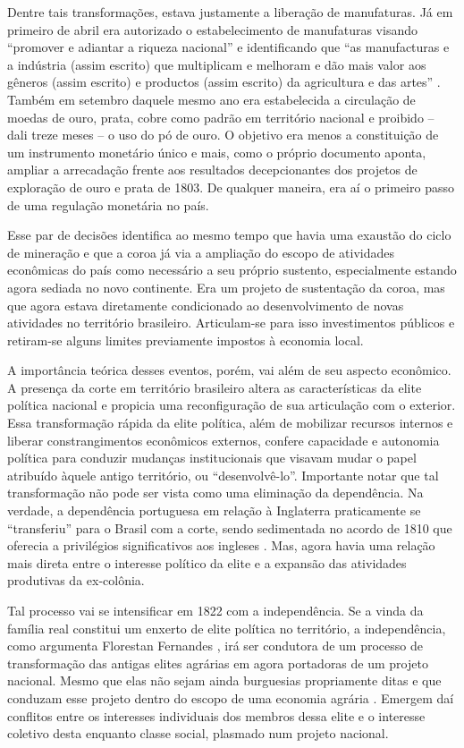 Dentre tais transformações, estava justamente a liberação de
manufaturas. Já em primeiro de abril era autorizado o estabelecimento de
manufaturas visando ``promover e adiantar a riqueza nacional'' e
identificando que ``as manufacturas e a indústria (assim escrito) que multiplicam
e melhoram e dão mais valor aos gêneros (assim escrito) e productos (assim escrito) da
agricultura e das artes'' \citep[]{alvará_1808}. Também em setembro daquele
mesmo ano era estabelecida a circulação de moedas de ouro, prata, cobre 
como padrão em território nacional e proibido -- dali treze meses -- o
uso do pó de ouro. O objetivo era menos a constituição de um instrumento
monetário único e mais, como o próprio documento aponta, ampliar a
arrecadação frente aos resultados decepcionantes dos projetos de
exploração de ouro e prata de 1803. De qualquer maneira, era aí o
primeiro passo de uma regulação monetária no país.

Esse par de decisões identifica ao mesmo tempo que havia uma exaustão do
ciclo de mineração e que a coroa já via a ampliação do escopo de
atividades econômicas do país como necessário a seu próprio sustento,
especialmente estando agora sediada no novo continente. Era um projeto
de sustentação da coroa, mas que agora estava diretamente condicionado
ao desenvolvimento de novas atividades no território brasileiro.
Articulam-se para isso investimentos públicos e retiram-se alguns
limites previamente impostos à economia local.

A importância teórica desses eventos, porém, vai além de seu
aspecto econômico. A presença da corte em território brasileiro altera as
características da elite política nacional e propicia uma reconfiguração de sua
articulação com o exterior. Essa transformação rápida da elite política,
além de mobilizar recursos internos e liberar constrangimentos
econômicos externos, confere capacidade e autonomia política para
conduzir mudanças institucionais que visavam mudar o papel atribuído
àquele antigo território, ou ``desenvolvê-lo''. Importante notar que
tal transformação não pode ser vista como uma eliminação da dependência.
Na verdade, a dependência portuguesa em relação à Inglaterra
praticamente se ``transferiu'' para o Brasil com a corte, sendo
sedimentada no acordo de 1810 que oferecia a privilégios significativos
aos ingleses \citep{furtado2005}. Mas, agora havia uma relação mais direta entre o interesse
político da elite e a expansão das atividades produtivas da ex-colônia.

Tal processo vai se intensificar em 1822 com a independência. Se a vinda
da família real constitui um enxerto de elite política no território, a
independência, como argumenta Florestan Fernandes
\citeyearpar{fernandes2020}, irá ser
condutora de um processo de transformação das antigas elites agrárias em
agora portadoras de um projeto nacional. Mesmo que elas não sejam ainda
burguesias propriamente ditas e que conduzam esse projeto dentro do
escopo de uma economia agrária
\citep{fernandes2020}.
Emergem daí conflitos entre os interesses individuais dos membros dessa
elite e o interesse coletivo desta enquanto classe social, plasmado num
projeto nacional.

